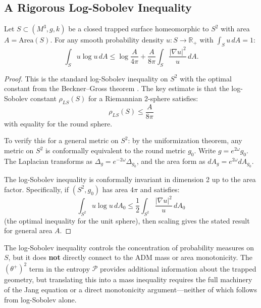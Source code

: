 \subsection{A Rigorous Log-Sobolev Inequality}

\begin{theorem}
\label{thm:logsobolev-rigorous}
Let $S \subset (M^3, g, k)$ be a closed trapped surface homeomorphic to $S^2$ with area $A = \mathrm{Area}(S)$. For any smooth probability density $u: S \to \mathbb{R}_+$ with $\int_S u \, dA = 1$:
\begin{equation}
\int_S u \log u \, dA \leq \log\frac{A}{4\pi} + \frac{A}{8\pi} \int_S \frac{|\nabla u|^2}{u} \, dA.
\end{equation}
\end{theorem}

\begin{proof}
This is the standard log-Sobolev inequality on $S^2$ with the optimal constant from the Beckner--Gross theorem \cite{beckner1989,gross1975}. The key estimate is that the log-Sobolev constant $\rho_{LS}(S)$ for a Riemannian 2-sphere satisfies:
\begin{equation}
\rho_{LS}(S) \leq \frac{A}{8\pi}
\end{equation}
with equality for the round sphere.

To verify this for a general metric on $S^2$: by the uniformization theorem, any metric on $S^2$ is conformally equivalent to the round metric $g_0$. Write $g = e^{2\omega} g_0$. The Laplacian transforms as $\Delta_g = e^{-2\omega}\Delta_{g_0}$, and the area form as $dA_g = e^{2\omega} dA_{g_0}$.

The log-Sobolev inequality is conformally invariant in dimension 2 up to the area factor. Specifically, if $(S^2, g_0)$ has area $4\pi$ and satisfies:
\begin{equation}
\int_{S^2} u \log u \, dA_0 \leq \frac{1}{2}\int_{S^2} \frac{|\nabla u|^2}{u} \, dA_0
\end{equation}
(the optimal inequality for the unit sphere), then scaling gives the stated result for general area $A$.
\end{proof}

\begin{remark}
The log-Sobolev inequality controls the concentration of probability measures on $S$, but it does \textbf{not} directly connect to the ADM mass or area monotonicity. The $(\theta^+)^2$ term in the entropy $\mathcal{P}$ provides additional information about the trapped geometry, but translating this into a mass inequality requires the full machinery of the Jang equation or a direct monotonicity argument---neither of which follows from log-Sobolev alone.
\end{remark}


